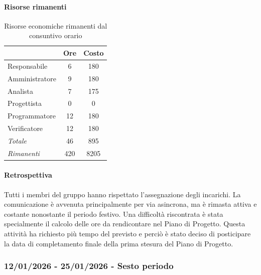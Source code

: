 \documentclass[a4paper,12pt]{article}
\begin{document}
            \paragraph{Risorse rimanenti}
                \begin{table}[H]
                \centering
                \begin{tabular}{|l|c|c|}
                \hline
                    \rowcolor{lightgray}{\textbf{Ruolo}} & {\textbf{Ore}} & {\textbf{Costo}}\\
                \hline
                    Responsabile & 6 & 180\\
                \hline
                    Amministratore & 9 & 180\\
                \hline
                    Analista & 7 & 175\\
                \hline
                    Progettista & 0 & 0\\
                \hline
                    Programmatore & 12 & 180\\
                \hline
                    Verificatore & 12 & 180\\
                \hline
                    \rowcolor{lightgray}\textit{Totale} & 46 & 895\\
                \hline
                    \rowcolor{lightgray}\textit{Rimanenti} & 420 & 8205\\
                \hline
                \end{tabular}
                \caption{Risorse economiche rimanenti dal consuntivo orario}
                \end{table}
                
            \paragraph{Retrospettiva}
            Tutti i membri del gruppo hanno rispettato l'assegnazione degli incarichi. La comunicazione è avvenuta principalmente per via asincrona, ma è rimasta attiva e costante nonostante il periodo festivo. Una difficoltà riscontrata è stata specialmente il calcolo delle ore da rendicontare nel Piano di Progetto. Questa attività ha richiesto più tempo del previsto e perciò è stato deciso di posticipare la data di completamento finale della prima stesura del Piano di Progetto.

        \subsubsection{12/01/2026 - 25/01/2026 - Sesto periodo}
\end{document}
